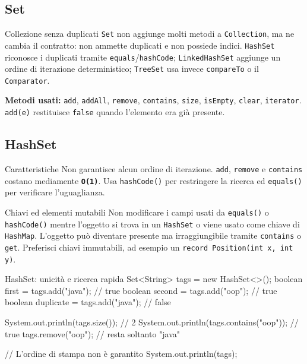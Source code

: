 ﻿\documentclass[10pt,a4paper]{article}
\newcommand{\cmd}[1]{\texttt{#1}}
\newcommand{\complexity}[1]{\textcolor{accent}{\texttt{\textbf{#1}}}}
\newcommand{\topicsubsection}[1]{\Needspace{10\baselineskip}\subsection{#1}}
\newenvironment{topicblock}{%
  \par\medskip\noindent\begin{minipage}{\textwidth}%
}{%
  \end{minipage}\par\medskip%
}
\begin{document}
\begin{topicblock}
\topicsubsection{Set}
\begin{concept}{Collezione senza duplicati}
\cmd{Set} non aggiunge molti metodi a \cmd{Collection}, ma ne cambia il
contratto: non ammette duplicati e non possiede indici.
\cmd{HashSet} riconosce i duplicati tramite \cmd{equals}/\cmd{hashCode};
\cmd{LinkedHashSet} aggiunge un ordine di iterazione deterministico;
\cmd{TreeSet} usa invece \cmd{compareTo} o il \cmd{Comparator}.

\textbf{Metodi usati:}
\cmd{add}, \cmd{addAll}, \cmd{remove}, \cmd{contains}, \cmd{size},
\cmd{isEmpty}, \cmd{clear}, \cmd{iterator}. \cmd{add(e)} restituisce
\cmd{false} quando l'elemento era già presente.
\end{concept}

\end{topicblock}
\begin{topicblock}
\topicsubsection{HashSet}
\begin{difference}{Caratteristiche}
Non garantisce alcun ordine di iterazione. \cmd{add}, \cmd{remove} e
\cmd{contains} costano mediamente \complexity{O(1)}. Usa \cmd{hashCode()}
per restringere la ricerca ed \cmd{equals()} per verificare l'uguaglianza.
\end{difference}

\begin{examtrap}{Chiavi ed elementi mutabili}
Non modificare i campi usati da \cmd{equals()} o \cmd{hashCode()} mentre
l'oggetto si trova in un \cmd{HashSet} o viene usato come chiave di
\cmd{HashMap}. L'oggetto può diventare presente ma irraggiungibile tramite
\cmd{contains} o \cmd{get}. Preferisci chiavi immutabili, ad esempio un
\cmd{record Position(int x, int y)}.
\end{examtrap}

\begin{codebox}{HashSet: unicità e ricerca rapida}
Set<String> tags = new HashSet<>();
boolean first = tags.add("java");  // true
boolean second = tags.add("oop");  // true
boolean duplicate = tags.add("java"); // false

System.out.println(tags.size()); // 2
System.out.println(tags.contains("oop")); // true
tags.remove("oop");              // resta soltanto "java"

// L'ordine di stampa non è garantito
System.out.println(tags);
\end{codebox}

\end{topicblock}
\end{document}
